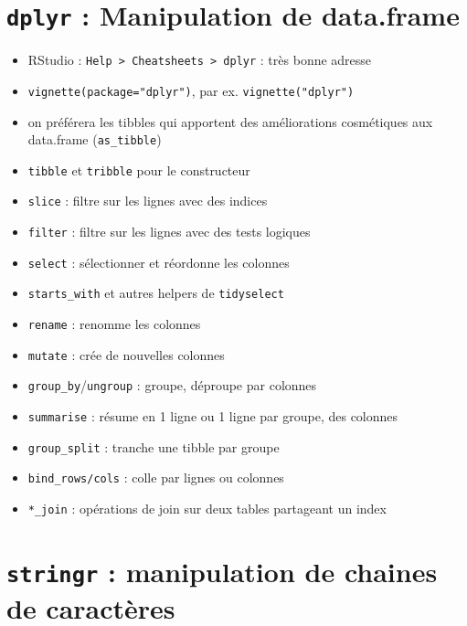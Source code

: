 \documentclass[
  letterpaper,
  DIV=11,
  numbers=noendperiod]{scrreprt}
\providecommand{\tightlist}{%
  \setlength{\itemsep}{0pt}\setlength{\parskip}{0pt}}\usepackage{longtable,booktabs,array}
\begin{document}
\hypertarget{dplyr-manipulation-de-data.frame}{%
\section{\texorpdfstring{\texttt{dplyr} : Manipulation de
data.frame}{dplyr : Manipulation de data.frame}}\label{dplyr-manipulation-de-data.frame}}

\begin{itemize}
\tightlist
\item
  RStudio :
  \texttt{Help\ \textgreater{}\ Cheatsheets\ \textgreater{}\ dplyr} :
  très bonne adresse
\item
  \texttt{vignette(package="dplyr")}, par ex. \texttt{vignette("dplyr")}
\item
  on préférera les tibbles qui apportent des améliorations cosmétiques
  aux data.frame (\texttt{as\_tibble})
\item
  \texttt{tibble} et \texttt{tribble} pour le constructeur
\item
  \texttt{slice} : filtre sur les lignes avec des indices
\item
  \texttt{filter} : filtre sur les lignes avec des tests logiques
\item
  \texttt{select} : sélectionner et réordonne les colonnes
\item
  \texttt{starts\_with} et autres helpers de \texttt{tidyselect}
\item
  \texttt{rename} : renomme les colonnes
\item
  \texttt{mutate} : crée de nouvelles colonnes
\item
  \texttt{group\_by}/\texttt{ungroup} : groupe, déproupe par colonnes
\item
  \texttt{summarise} : résume en 1 ligne ou 1 ligne par groupe, des
  colonnes
\item
  \texttt{group\_split} : tranche une tibble par groupe
\item
  \texttt{bind\_rows/cols} : colle par lignes ou colonnes
\item
  \texttt{*\_join} : opérations de join sur deux tables partageant un
  index
\end{itemize}

\hypertarget{stringr-manipulation-de-chaines-de-caractuxe8res}{%
\section{\texorpdfstring{\texttt{stringr} : manipulation de chaines de
caractères}{stringr : manipulation de chaines de caractères}}\label{stringr-manipulation-de-chaines-de-caractuxe8res}}
\end{document}
